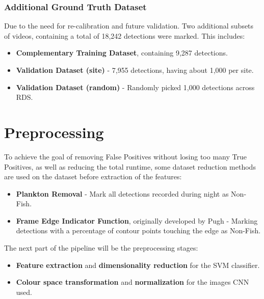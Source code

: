 \documentclass[bsc,logo,twoside,fullspacing,parskip]{infthesis}
\begin{document}
\vspace{-10pt}

\subsection{Additional Ground Truth Dataset}
\label{sec:additionalgt}

Due to the need for re-calibration and future validation. 
Two additional subsets of videos, containing a total of 18,242 detections were marked.
This includes:

\begin{itemize}
\setlength{\parskip}{1pt}
\item
\textbf{Complementary Training Dataset}, containing 9,287 detections. 
\item
\textbf{Validation Dataset (site)} - 7,955 detections, having about 1,000 per site.
\item
\textbf{Validation Dataset (random)} - Randomly picked 1,000 detections across RDS.
\end{itemize}

\chapter{Preprocessing}
\label{chap:prepro}

To achieve the goal of removing False Positives without losing too many True Positives, as well as reducing the total runtime, some dataset reduction methods are used on the dataset before extraction of the features: 

\begin{itemize}
\setlength{\parskip}{1pt}
\item \textbf{Plankton Removal} - Mark all detections recorded during night as Non-Fish.
\item \textbf{Frame Edge Indicator Function}, originally developed by Pugh\cite{Pugh} - Marking detections with a percentage of contour points touching the edge as Non-Fish. 
\end{itemize}

The next part of the pipeline will be the preprocessing stages:

\begin{itemize}
\setlength{\parskip}{1pt}
\item \textbf{Feature extraction} and \textbf{dimensionality reduction} for the SVM classifier.
\item \textbf{Colour space transformation} and \textbf{normalization} for the images CNN used. 
\end{itemize}
\end{document}
